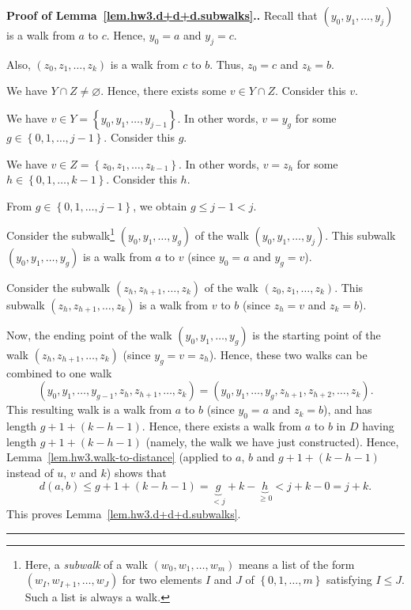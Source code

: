 \documentclass[numbers=enddot,12pt,final,onecolumn,notitlepage]{scrartcl}%
\theoremstyle{definition}
\newenvironment{proof}[1][Proof]{\noindent\textbf{#1.} }{\ \rule{0.5em}{0.5em}}
\newcommand{\set}[1]{\left\{ #1 \right\}}
\newcommand{\tup}[1]{\left( #1 \right)}
\begin{document}
\begin{proof}[Proof of Lemma~\ref{lem.hw3.d+d+d.subwalks}.]
Recall that $\tup{y_0, y_1, \ldots, y_j}$ is a walk from $a$ to $c$.
Hence, $y_0 = a$ and $y_j = c$.

Also, $\tup{z_0, z_1, \ldots, z_k}$ is a walk from $c$ to $b$.
Thus, $z_0 = c$ and $z_k = b$.

We have $Y \cap Z \neq \varnothing$.
Hence, there exists some $v \in Y \cap Z$.
Consider this $v$.

We have $v \in Y = \set{y_0, y_1, \ldots, y_{j-1}}$.
In other words, $v = y_g$ for some $g \in \set{0, 1, \ldots, j-1}$.
Consider this $g$.

We have $v \in Z = \set{z_0, z_1, \ldots, z_{k-1}}$.
In other words, $v = z_h$ for some $h \in \set{0, 1, \ldots, k-1}$.
Consider this $h$.

From $g \in \set{0, 1, \ldots, j-1}$, we obtain $g \leq j-1 < j$.

Consider the
subwalk\footnote{Here, a \textit{subwalk} of a walk
  $\tup{w_0, w_1, \ldots, w_m}$ means a list of the form
  $\tup{w_I, w_{I+1}, \ldots, w_J}$
  for two elements $I$ and $J$ of $\set{0, 1, \ldots, m}$
  satisfying $I \leq J$.
  Such a list is always a walk.}
$\tup{y_0, y_1, \ldots, y_g}$ of the walk
$\tup{y_0, y_1, \ldots, y_j}$.
This subwalk $\tup{y_0, y_1, \ldots, y_g}$ is a walk from $a$ to $v$
(since $y_0 = a$ and $y_g = v$).

Consider the subwalk $\tup{z_h, z_{h+1}, \ldots, z_k}$ of the walk
$\tup{z_0, z_1, \ldots, z_k}$.
This subwalk $\tup{z_h, z_{h+1}, \ldots, z_k}$ is a walk from $v$
to $b$ (since $z_h = v$ and $z_k = b$).

Now, the ending point of the walk $\tup{y_0, y_1, \ldots, y_g}$ is the
starting point of the walk $\tup{z_h, z_{h+1}, \ldots, z_k}$ (since
$y_g = v = z_h$).
Hence, these two walks can be combined to one walk
\[
\tup{y_0, y_1, \ldots, y_{g-1}, z_h, z_{h+1}, \ldots, z_k}
=
\tup{y_0, y_1, \ldots, y_g, z_{h+1}, z_{h+2}, \ldots, z_k} .
\]
This resulting walk is a walk from $a$ to $b$ (since $y_0 = a$ and
$z_k = b$), and has length $g + 1 + \tup{k-h-1}$.
Hence, there exists a walk from $a$ to $b$ in $D$ having length
$g + 1 + \tup{k-h-1}$ (namely, the walk we have just constructed).
Hence, Lemma~\ref{lem.hw3.walk-to-distance} (applied to $a$, $b$ and
$g + 1 + \tup{k-h-1}$ instead of $u$, $v$ and $k$) shows that
\[
d \tup{a, b}
\leq g + 1 + \tup{k-h-1}
= \underbrace{g}_{< j} + k - \underbrace{h}_{\geq 0}
< j + k - 0 = j + k.
\]
This proves Lemma~\ref{lem.hw3.d+d+d.subwalks}.
\end{proof}
\end{document}
